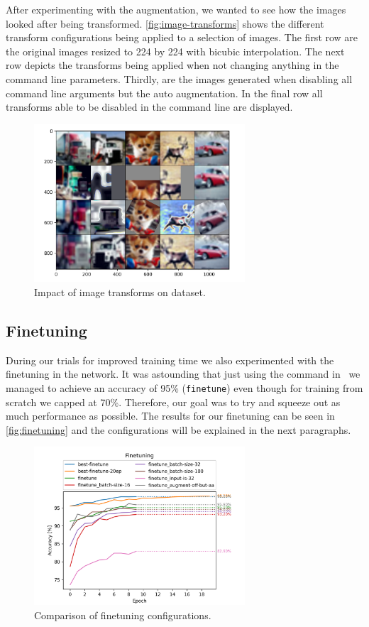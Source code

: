 \documentclass{article}
\begin{document}
After experimenting with the augmentation, we wanted to see how the images looked after being transformed.
\autoref{fig:image-transforms} shows the different transform configurations being applied to a selection of images.
The first row are the original images resized to 224 by 224 with bicubic interpolation.
The next row depicts the transforms being applied when not changing anything in the command line parameters.
Thirdly, are the images generated when disabling all command line arguments but the auto augmentation.
In the final row all transforms able to be disabled in the command line are displayed.
\begin{figure}[h]
    \centering
    \includegraphics[width=0.7\textwidth]{images/image_transforms}
    \caption{Impact of image transforms on dataset.}
    \label{fig:image-transforms}
\end{figure}

\subsection{Finetuning}\label{subsec:finetuning}
During our trials for improved training time we also experimented with the finetuning in the network.
It was astounding that just using the command in~\cite{ayush0finetune} we managed to achieve an accuracy of 95\% (\texttt{finetune}) even though for training from scratch we capped at 70\%.
Therefore, our goal was to try and squeeze out as much performance as possible.
The results for our finetuning can be seen in \autoref{fig:finetuning} and the configurations will be explained in the next paragraphs.
\begin{figure}[h]
    \centering
    \includegraphics[width=0.7\textwidth]{images/finetuning}
    \caption{Comparison of finetuning configurations.}
    \label{fig:finetuning}
\end{figure}
\end{document}
